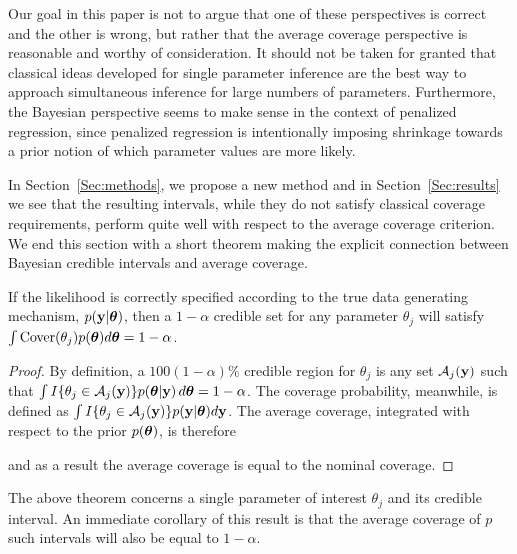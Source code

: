 Our goal in this paper is not to argue that one of these perspectives is correct and the other is wrong, but rather that the average coverage perspective is reasonable and worthy of consideration. It should not be taken for granted that classical ideas developed for single parameter inference are the best way to approach simultaneous inference for large numbers of parameters. Furthermore, the Bayesian perspective seems to make sense in the context of penalized regression, since penalized regression is intentionally imposing shrinkage towards a prior notion of which parameter values are more likely.

In Section~\ref{Sec:methods}, we propose a new method and in Section~\ref{Sec:results} we see that the resulting intervals, while they do not satisfy classical coverage requirements, perform quite well with respect to the average coverage criterion. We end this section with a short theorem making the explicit connection between Bayesian credible intervals and average coverage.

\begin{thm}
  \label{Thm:bcc}
  If the likelihood is correctly specified according to the true data generating mechanism, $p(\mathbf{y} | \boldsymbol{\theta})$, then a $1-\alpha$ credible set for any parameter $\theta_j$ will satisfy $\int \textrm{Cover}(\theta_j)p(\boldsymbol{\theta}) d\boldsymbol{\theta} = 1 - \alpha$.
\end{thm}

\begin{proof}
By definition, a $100(1-\alpha)\%$ credible region for $\theta_j$ is any set $\mathcal{A}_j(\mathbf{y})$ such that $\int I\{\theta_j \in \mathcal{A}_j(\mathbf{y})\} p(\boldsymbol{\theta}|\mathbf{y})\,d\boldsymbol{\theta} = 1 - \alpha$. The coverage probability, meanwhile, is defined as $\int I\{\theta_j \in \mathcal{A}_j(\mathbf{y})\} p(\mathbf{y} | \boldsymbol{\theta})d\mathbf{y}$. The average coverage, integrated with respect to the prior $p(\boldsymbol{\theta})$, is therefore


and as a result the average coverage is equal to the nominal coverage.
\end{proof}

The above theorem concerns a single parameter of interest $\theta_j$ and its credible interval. An immediate corollary of this result is that the average coverage of $p$ such intervals will also be equal to $1-\alpha$.

